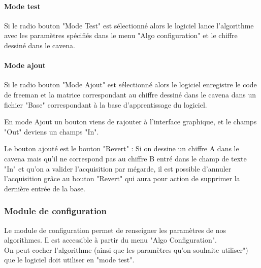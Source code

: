 \documentclass[10pt,a4paper]{report}
\begin{document}
\paragraph*{Mode test}
\begin{flushleft}
Si le radio bouton "Mode Test" est sélectionné alors le logiciel lance l'algorithme avec les paramètres spécifiés dans le menu "Algo configuration" et le chiffre dessiné dans le cavena.
\end{flushleft}


\paragraph*{Mode ajout}
\begin{flushleft}
Si le radio bouton "Mode Ajout" est sélectionné alors le logiciel enregistre le code de freeman et la matrice correspondant au chiffre dessiné dans le cavena dans un fichier "Base" correspondant à la base d'apprentissage du logiciel.

En mode Ajout un bouton viens de rajouter à l'interface graphique, et le champs "Out" deviens un champs "In".

\item Le bouton ajouté est le bouton "Revert" : Si on dessine un chiffre A dans le cavena mais qu'il ne correspond pas au chiffre B entré dans le champ de texte "In" et qu'on a valider l'acquisition par mégarde, il est possible d'annuler l'acquisition grâce au bouton "Revert" qui aura pour action de supprimer la dernière entrée de la base.

\end{flushleft}

\subsubsection{Module de configuration}

\begin{flushleft}
Le module de configuration permet de renseigner les paramètres de nos algorithmes. Il est accessible à partir du menu "Algo Configuration".\\
On peut cocher l'algorithme (ainsi que les paramètres qu'on souhaite utiliser") que le logiciel doit utiliser en "mode test". 
\end{flushleft}
\end{document}
